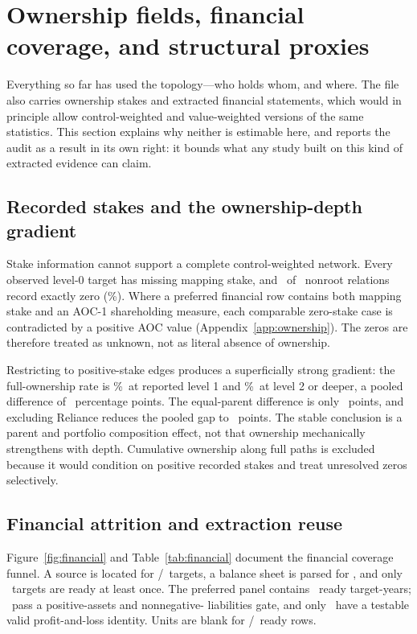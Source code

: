 \documentclass[11pt]{article}
\newcommand{\pct}{\%}
\newcommand{\pp}{percentage points}
\newcommand{\FloatBarrier}{\clearpage}
\begin{document}
\FloatBarrier

\section{Ownership fields, financial coverage, and structural proxies}
\label{sec:financial}

Everything so far has used the topology---who holds whom, and where. The file
also carries ownership stakes and extracted financial statements, which would in
principle allow control-weighted and value-weighted versions of the same
statistics. This section explains why neither is estimable here, and reports
the audit as a result in its own right: it bounds what any study built on this
kind of extracted evidence can claim.

\subsection{Recorded stakes and the ownership-depth gradient}

Stake information cannot support a complete control-weighted network. Every
observed level-0 target has missing mapping stake, and \ZeroStakeCount\ of
\NonrootEdges\ nonroot relations record exactly zero (\ZeroStakePct\pct).
Where a preferred financial row contains both mapping stake and an AOC-1
shareholding measure, each comparable zero-stake case is contradicted by a
positive AOC value (Appendix~\ref{app:ownership}). The zeros are therefore
treated as unknown, not as literal absence of ownership.

Restricting to positive-stake edges produces a superficially strong gradient:
the full-ownership rate is \OwnershipLevelOne\pct\ at reported level 1 and
\OwnershipLevelTwoPlus\pct\ at level 2 or deeper, a pooled difference of
\OwnershipPooledGap\ \pp. The equal-parent difference is only
\OwnershipEqualGap\ points, and excluding Reliance reduces the pooled gap to
\OwnershipNoRelianceGap\ points. The stable conclusion is a parent and
portfolio composition effect, not that ownership mechanically strengthens
with depth. Cumulative ownership along full paths is excluded because it would
condition on positive recorded stakes and treat unresolved zeros selectively.

\subsection{Financial attrition and extraction reuse}

Figure~\ref{fig:financial} and Table~\ref{tab:financial} document the financial
coverage funnel. A source is located for \SourceTargets/\Targets\ targets, a
balance sheet is parsed for \ParsedTargets, and only \ReadyTargets\ targets
are ready at least once. The preferred panel contains \ReadyRows\ ready
target-years; \SignPlausibleRows\ pass a positive-assets and nonnegative-
liabilities gate, and only \PlValidRows\ have a testable valid profit-and-loss
identity. Units are blank for \MissingUnitsReady/\ReadyRows\ ready rows.
\end{document}
